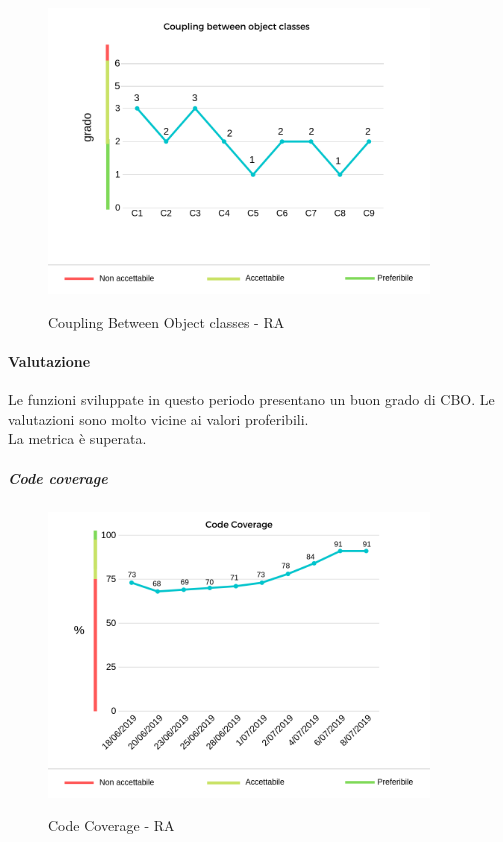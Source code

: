 	\begin{center}
		\begin{figure}[h] 
			\centering 
			\includegraphics[width=0.90\textwidth]{res/images/new/cbo.png}\\
			\caption{Coupling Between Object classes - RA}
		\end{figure}
	\end{center}
	\paragraph*{Valutazione} Le funzioni sviluppate in questo periodo presentano un buon grado di CBO. Le valutazioni sono molto vicine ai valori proferibili. \\ 
	La metrica è superata. 
	\pagebreak
	\subparagraph{Code coverage}
	\begin{center}
		\begin{figure}[h] 
			\centering 
			\includegraphics[width=0.90\textwidth]{res/images/new/codecov.png}\\
			\caption{Code Coverage - RA}
		\end{figure}
	\end{center}
